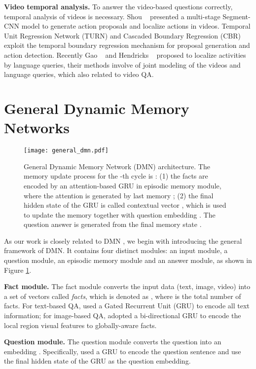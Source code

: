 \documentclass[10pt,twocolumn,letterpaper]{article}
\begin{document}
\textbf{Video temporal analysis.} To answer the video-based questions correctly, temporal analysis of videos is necessary.
Shou \etal~\cite{Shou_2016_CVPR} presented a multi-stage Segment-CNN model to generate action proposals and localize actions in videos.
Temporal Unit Regression Network (TURN) \cite{Gao_2017_ICCV_TURN} and Cascaded Boundary Regression (CBR) \cite{Gao_2017_cbr} exploit the temporal boundary regression mechanism for proposal generation and action detection. 
Recently Gao \etal~\cite{Gao_2017_ICCV_TALL} and Hendricks \etal~\cite{Hendricks_2017_ICCV} proposed to localize activities by language queries, their methods involve of joint modeling of the videos and language queries, which also related to video QA.




\section{General Dynamic Memory Networks}

\begin{figure}[]
  \centering
    \texttt{[image: general\_dmn.pdf]}
    \caption{General Dynamic Memory Network (DMN) \cite{kumar2016ask} architecture. The memory update process for the -th cycle is : (1) the facts  are encoded by an attention-based GRU in episodic memory module, where the attention is generated by last memory ; (2) the final hidden state of the GRU is called contextual vector , which is used to update the memory  together with question embedding . The question answer is generated from the final memory state .}
      \label{fig:general_dmn}
\end{figure}


As our work is closely related to DMN \cite{kumar2016ask, xiong2016dynamic}, we begin with introducing the general framework of DMN. It contains four distinct modules: an input module, a question module, an episodic memory module and an answer module, as shown in Figure \ref{fig:general_dmn}. 

\textbf{Fact module.} The fact module converts the input data (\eg text, image, video) into a set of vectors called \emph{facts}, which is denoted as , where  is the total number of facts. For text-based QA, \cite{kumar2016ask} used a Gated Recurrent Unit (GRU) to encode all text information; for image-based QA, \cite{xiong2016dynamic} adopted a bi-directional GRU to encode the local region visual features to globally-aware facts.

\textbf{Question module.} The question module converts the question into an embedding . Specifically, \cite{kumar2016ask, xiong2016dynamic}  used a GRU to encode the question sentence and use the final hidden state of the GRU as the question embedding.
\end{document}
